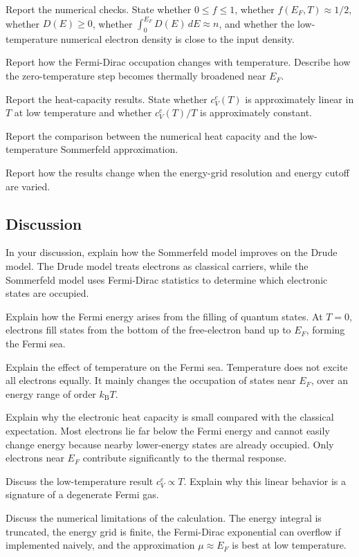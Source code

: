 Report the numerical checks. State whether \(0\le f\le1\), whether \(f(E_F,T)\approx1/2\), whether \(D(E)\ge0\), whether \(\int_0^{E_F}D(E)\,dE\approx n\), and whether the low-temperature numerical electron density is close to the input density.

Report how the Fermi-Dirac occupation changes with temperature. Describe how the zero-temperature step becomes thermally broadened near \(E_F\).

Report the heat-capacity results. State whether \(c_V^{e}(T)\) is approximately linear in \(T\) at low temperature and whether \(c_V^{e}(T)/T\) is approximately constant.

Report the comparison between the numerical heat capacity and the low-temperature Sommerfeld approximation.

Report how the results change when the energy-grid resolution and energy cutoff are varied.

\subsection{Discussion}

In your discussion, explain how the Sommerfeld model improves on the Drude model. The Drude model treats electrons as classical carriers, while the Sommerfeld model uses Fermi-Dirac statistics to determine which electronic states are occupied.

Explain how the Fermi energy arises from the filling of quantum states. At \(T=0\), electrons fill states from the bottom of the free-electron band up to \(E_F\), forming the Fermi sea.

Explain the effect of temperature on the Fermi sea. Temperature does not excite all electrons equally. It mainly changes the occupation of states near \(E_F\), over an energy range of order \(k_{\mathrm B}T\).

Explain why the electronic heat capacity is small compared with the classical expectation. Most electrons lie far below the Fermi energy and cannot easily change energy because nearby lower-energy states are already occupied. Only electrons near \(E_F\) contribute significantly to the thermal response.

Discuss the low-temperature result \(c_V^{e}\propto T\). Explain why this linear behavior is a signature of a degenerate Fermi gas.

Discuss the numerical limitations of the calculation. The energy integral is truncated, the energy grid is finite, the Fermi-Dirac exponential can overflow if implemented naively, and the approximation \(\mu\approx E_F\) is best at low temperature.

